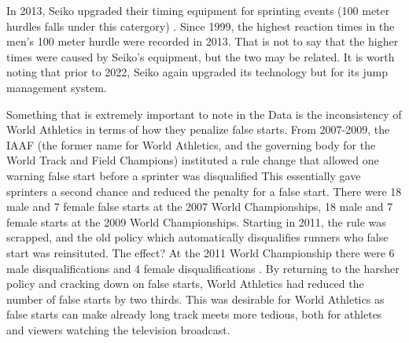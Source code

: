 \documentclass[12pt, letterpaper, titlepage]{article}
\begin{document}
In 2013, Seiko upgraded their timing equipment for sprinting events (100 meter hurdles
falls under this catergory) \citep{WorldAthletics_2013}.  Since 1999, the highest reaction 
times in the men's 100 meter hurdle were recorded in 2013.  That is not to say that the higher 
times were caused by Seiko's equipment, but the two may be related.  It is worth noting that prior
to 2022, Seiko again upgraded its technology but for its jump management system.

Something that is extremely important to note in the Data is the inconsistency of World Athletics 
in terms of how they penalize false starts.  From 2007-2009, the IAAF (the former name for World 
Athletics, and the governing body for the World Track and Field Champions) instituted a rule change
that allowed one warning false start before a sprinter was disqualified \citep{False-Start}  This 
essentially gave sprinters a second chance and reduced the penalty for a false start.  There were 
18 male and 7 female false starts at the 2007 World Championships, 18 male and 7 female starts at 
the 2009 World Championships. Starting in 2011, the rule was scrapped, and the old policy which 
automatically disqualifies runners who false start was reinsituted.  The effect? At the 2011 World
Championship there were 6 male disqualifications and 4 female disqualifications \citep{False-Start}. 
By returning to the harsher policy and cracking down on false starts, World Athletics had reduced the
number of false starts by two thirds. This was desirable for World Athletics as false starts can 
make already long track meets more tedious, both for athletes and viewers watching the 
television broadcast.\citep{Pilianidis}
\end{document}
